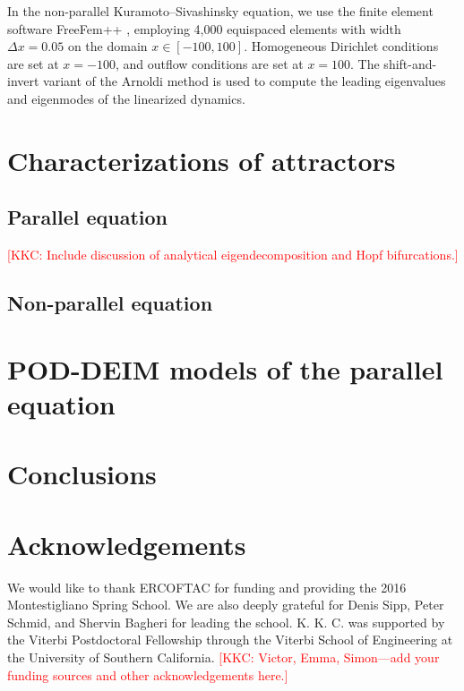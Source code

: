 \documentclass[11pt]{article}
\newcommand{\KSE}{Kuramoto--Sivashinsky equation}
\newcommand{\kkc}[1]{\textcolor{red}{[KKC: #1]}}
\begin{document}
In the non-parallel \KSE, we use the finite element software FreeFem++ \citep{HechtJNM12}, employing 4,000 equispaced elements with width $\Delta x = 0.05$ on the domain $x \in [-100, 100]$.
Homogeneous Dirichlet conditions are set at $x = -100$, and outflow conditions are set at $x = 100$.
The shift-and-invert variant of the Arnoldi method \citep[see][]{TrefethenNLA} is used to compute the leading eigenvalues and eigenmodes of the linearized dynamics.

\section{Characterizations of attractors}
\label{sec:attractors}

\subsection{Parallel equation}

\kkc{Include discussion of analytical eigendecomposition and Hopf bifurcations.}

\subsection{Non-parallel equation}

\section{POD-DEIM models of the parallel equation}
\label{sec:pod-deim}

\section{Conclusions}
\label{sec:conclusions}

\section{Acknowledgements}

We would like to thank ERCOFTAC for funding and providing the 2016 Montestigliano Spring School.
We are also deeply grateful for Denis Sipp, Peter Schmid, and Shervin Bagheri for leading the school.
K. K. C. was supported by the Viterbi Postdoctoral Fellowship through the Viterbi School of Engineering at the University of Southern California.
\kkc{Victor, Emma, Simon---add your funding sources and other acknowledgements here.}


\end{document}
